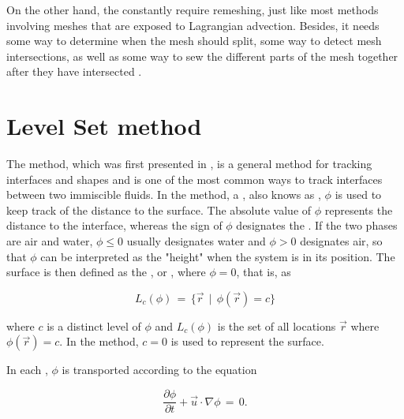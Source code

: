 On the other hand, the constantly require remeshing, just like most methods involving meshes that are exposed to Lagrangian advection. Besides, it needs some way to determine when the mesh should split, some way to detect mesh intersections, as well as some way to sew the different parts of the mesh together after they have intersected \citep{Wojtan2009}.

\section{Level Set method}

The \LS method, which was first presented in \citeyear{Osher1988} \citep{Osher1988}, is a general method for tracking interfaces and shapes and is one of the most common ways to track interfaces between two immiscible fluids. In the \LS method, a , also knows as , $\phi$ is used to keep track of the distance to the surface. The absolute value of $\phi$ represents the distance to the interface, whereas the sign of $\phi$ designates the \phase. If the two phases are air and water, $\phi \leq 0$ usually designates water and $\phi > 0$ designates air, so that $\phi$ can be interpreted as the "height" when the system is in its \equilibrium position. The surface is then defined as the \isosurface, or , where $\phi = 0$, that is, as

\begin{equation} \label{eq:level_set}
L_c(\phi) \,=\, \{\vec{r} \,\mid\, \phi(\vec{r})=c\}
\end{equation}

where $c$ is a distinct level of $\phi$ and $L_c(\phi)$ is the set of all locations $\vec{r}$ where $\phi(\vec{r}) = c$. In the \LS method, $c = 0$ is used to represent the surface.

In each , $\phi$ is transported according to the equation

\begin{equation} \label{eq:level_set_function_transport}
\frac{\partial\phi}{\partial t} + \vec{u}\cdot\nabla\phi \,=\, 0.
\end{equation}

